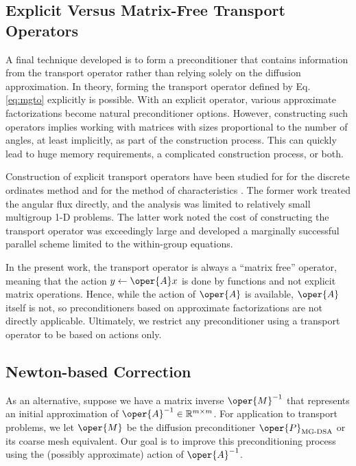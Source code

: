 \subsection{Explicit Versus Matrix-Free Transport Operators}

A final technique developed is to form a preconditioner that contains
information from the transport operator rather than relying solely on 
the diffusion approximation.   In theory, forming the transport operator 
defined by Eq. \ref{eq:mgto} explicitly is possible.
With an explicit operator, various 
approximate factorizations become natural preconditioner options. 
However, constructing such operators implies working with matrices with 
sizes proportional to the  number of angles, at least implicitly, as part 
of the construction process. This can quickly lead to huge memory 
requirements, a complicated  construction process, or both.  

Construction of explicit transport operators have been studied for 
for the discrete ordinates method \cite{patton2002apg} and for the method of 
characteristics \cite{zhang2011ctm}. The former work treated the angular 
flux directly, and the analysis was limited to relatively small multigroup
1-D problems.  The latter work noted the cost of constructing the 
transport operator was exceedingly large and developed a marginally 
successful parallel scheme limited to the within-group equations.

In the present work, the transport operator is always a 
``matrix free'' operator,  meaning that the action $y \gets \oper{A}x$
is done by functions and not explicit matrix operations.  Hence, while 
the action of $\oper{A}$ is available, $\oper{A}$ itself is not,  
so preconditioners based on approximate factorizations are not directly 
applicable.  Ultimately, we restrict any preconditioner using a 
transport operator to be based on actions only.

\subsection{Newton-based Correction}

As an alternative, suppose we have a matrix inverse 
$\oper{M}^{-1}$ that represents an initial approximation of 
$\oper{A}^{-1}  \in \mathbb{R}^{m\times m}$.  For application to 
transport problems, we let $\oper{M}$ be the diffusion 
preconditioner $\oper{P}_{\text{MG-DSA}}$ or its coarse mesh equivalent.
Our goal is to improve this preconditioning process using the 
(possibly approximate) action of $\oper{A}^{-1}$.

